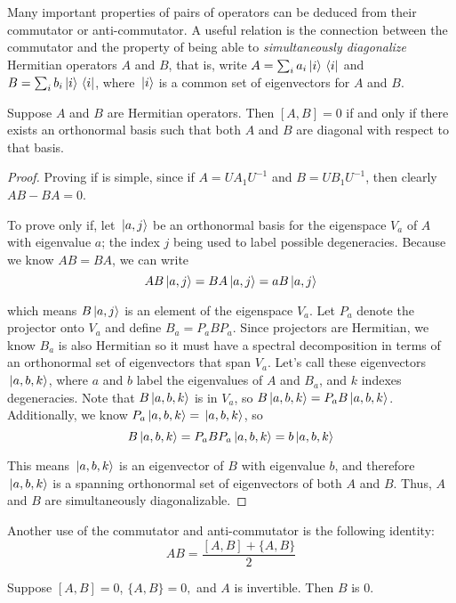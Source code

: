Many important properties of pairs of operators can be deduced from their commutator or anti-commutator. A useful relation is the connection between the commutator and the property of being able to \textit{simultaneously diagonalize} Hermitian operators $A$ and $B$, that is, write $A = \sum_{i} a_{i} \ket*{i} \bra*{i}$ and $B = \sum_{i} b_{i} \ket*{i} \bra*{i}$, where $\ket*{i}$ is a common set of eigenvectors for $A$ and $B$. 

\begin{theorem}
Suppose $A$ and $B$ are Hermitian operators. Then $[A, B] = 0$ if and only if there exists an orthonormal basis such that both $A$ and $B$ are diagonal with respect to that basis. 
\end{theorem}

\begin{proof}
Proving if is simple, since if $A= UA_{1}U^{-1}$ and $B = UB_{1}U^{-1}$, then clearly $AB - BA = 0$. 

To prove only if, let $\ket*{a, j}$ be an orthonormal basis for the eigenspace $V_{a}$ of $A$ with eigenvalue $a$; the index $j$ being used to label possible degeneracies. Because we know $AB = BA$, we can write
$$AB \ket*{a, j} = BA \ket*{a, j} = aB \ket*{a, j}$$

which means $B\ket*{a, j}$ is an element of the eigenspace $V_{a}$. Let $P_{a}$ denote the projector onto $V_{a}$ and define $B_{a} = P_{a} BP_{a}$. Since projectors are Hermitian, we know $B_{a}$ is also Hermitian so it must have a spectral decomposition in terms of an orthonormal set of eigenvectors that span $V_{a}$. Let's call these eigenvectors $\ket*{a, b, k}$, where $a$ and $b$ label the eigenvalues of $A$ and $B_{a}$, and $k$ indexes degeneracies. Note that $B \ket*{a, b, k}$ is in $V_{a}$, so $B \ket*{a, b, k} = P_{a} B \ket*{a, b, k}$. Additionally, we know $P_{a} \ket*{a, b, k} = \ket*{a, b, k}$, so 
$$B \ket*{a, b, k} = P_{a} B P_{a} \ket*{a, b, k} = b \ket*{a, b, k}$$

This means $\ket*{a, b, k}$ is an eigenvector of $B$ with eigenvalue $b$, and therefore $\ket*{a, b, k}$ is a spanning orthonormal set of eigenvectors of both $A$ and $B$. Thus, $A$ and $B$ are simultaneously diagonalizable. 
\end{proof}

Another use of the commutator and anti-commutator is the following identity: 
$$AB = \frac{[A, B] + \{A, B\}}{2}$$

\begin{lemma}
Suppose $[A, B] = 0$, $\{A, B\} = 0,$ and $A$ is invertible. Then $B$ is 0. 
\end{lemma}

